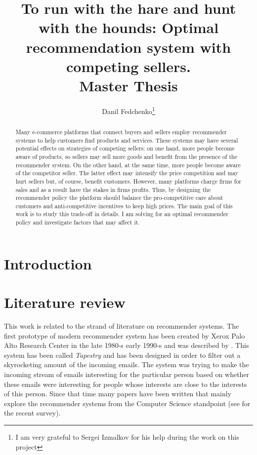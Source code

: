 \documentclass[a4paper]{article}
\title{To run with the hare and hunt with the hounds: Optimal recommendation system with competing sellers. \\ Master Thesis}
\date{}
\author{Danil Fedchenko\thanks{I am very grateful to Sergei Izmalkov for his help during the work on this project}}
\begin{document}
	\maketitle
	\begin{abstract}
		Many e-commerce platforms that connect buyers and sellers employ recommender systems to help customers find products and services. These systems may have several potential effects on strategies of competing sellers: on one hand, more people become aware of products, so sellers may sell more goods and benefit from the presence of the recommender system. On the other hand, at the same time, more people become aware of the competitor seller. The latter effect may intensify the price competition and may hurt sellers but, of course, benefit customers. However, many platforms charge firms for sales and as a result have the stakes in firms profits. Thus, by designing the recommender policy the platform should balance the pro-competitive care about customers and anti-competitive incentives to keep high prices. The main goal of this work is to study this trade-off in details. I am solving for an optimal recommender policy and investigate factors that may affect it.
	\end{abstract}
\newpage
\tableofcontents
\newpage
	\section{Introduction}
	\section{Literature review}
	
		This work is related to the strand of literature on recommender systems. The first prototype of modern recommender system has been created by Xerox Palo Alto Research Center in the late 1980-s early 1990-s and was described by  \cite{goldberg1992using}. This system has been called \textit{Tapestry} and has been designed in order to filter out a skyrocketing amount of the incoming emails. The system was trying to make the incoming stream of emails interesting for the particular person based on whether these emails were interesting for people whose interests are close to the interests of this person. Since that time many papers have been written that mainly explore the recommender systems from the Computer Science standpoint (see \cite{Beel2015r} for the recent survey). 
	
	
	
	
	
\end{document}
